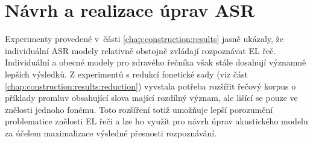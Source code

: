 \chapter{Návrh a realizace úprav ASR}
\label{chap:realisation}

Experimenty provedené v~části \ref{chap:construction:results} jasně ukázaly, že individuální ASR modely relativně obstojně zvládají rozpoznávat EL řeč.
Individuální a obecné modely pro zdravého řečníka však stále dosahují významně lepších výsledků.
Z experimentů s redukcí fonetické sady (viz část \ref{chap:construction:results:reduction}) vyvstala potřeba rozšířit řečový korpus o příklady promluv obsahující slova mající rozdílný význam, ale lišící se pouze ve znělosti jednoho fonému.
Toto rozšíření totiž umožňuje lepší porozumění problematice znělosti EL řeči a lze ho využít pro návrh úprav akustického modelu za účelem maximalizace výsledné přesnosti rozpoznávání.










